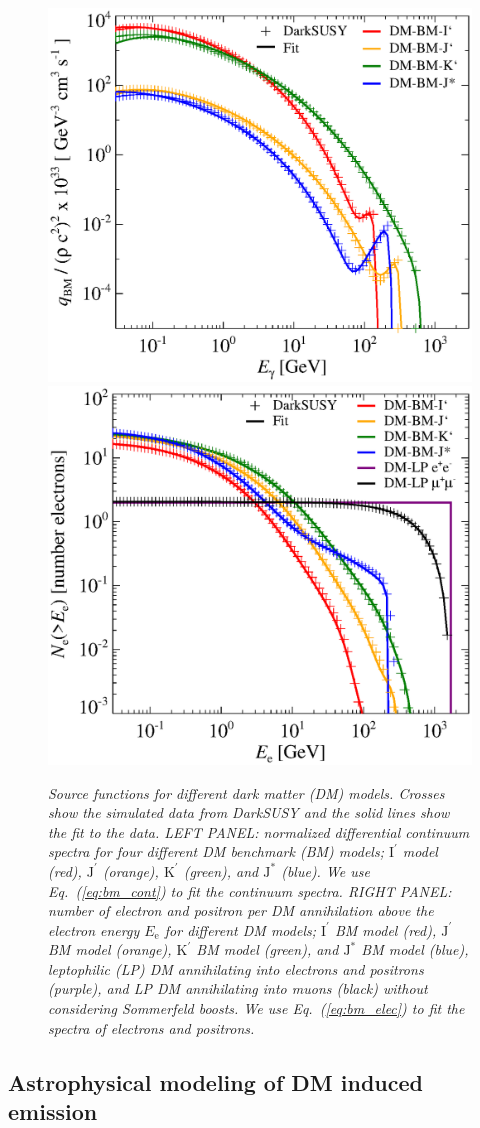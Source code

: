 \documentclass[10pt,aps,pra,reprint,amsmath,amsfonts,amssymb,showpacs,nofootinbib,floatfix]{revtex4-1}
\newcommand{\rmn}{\mathrm}
\newcommand{\ee}{E_\rmn{e}}
\newcommand{\Kp}{\rmn{K}^\prime}
\newcommand{\Ip}{\rmn{I}^\prime}
\newcommand{\Js}{\rmn{J}^*}
\newcommand{\Jp}{\rmn{J}^\prime}
\begin{document}
\begin{figure}
\begin{minipage}{2.0\columnwidth}
 \includegraphics[width=0.49\columnwidth]{figures/fit.ds.flux.eps}
 \includegraphics[width=0.49\columnwidth]{figures/fit.epflux.int.eps}
 \caption{\it Source functions for different dark matter (DM)
   models. Crosses show the simulated data from DarkSUSY and the solid
   lines show the fit to the data. LEFT PANEL: normalized differential
   continuum spectra for four different DM benchmark (BM) models;
   $\Ip$ model (red), $\Jp$ (orange), $\Kp$ (green), and $\Js$
   (blue). We use Eq.~(\ref{eq:bm_cont}) to fit the continuum
   spectra. RIGHT PANEL: number of electron and positron per DM
   annihilation above the electron energy $\ee$ for different DM
   models; $\Ip$ BM model (red), $\Jp$ BM model (orange), $\Kp$ BM
   model (green), and $\Js$ BM model (blue), leptophilic (LP) DM
   annihilating into electrons and positrons (purple), and LP DM
   annihilating into muons (black) without considering Sommerfeld
   boosts. We use Eq.~(\ref{eq:bm_elec}) to fit the spectra of
   electrons and positrons.}
 \label{fig:q_DM}
\end{minipage}
\end{figure}


\subsection{Astrophysical modeling of DM induced emission}
\label{sect:AP}
\end{document}
